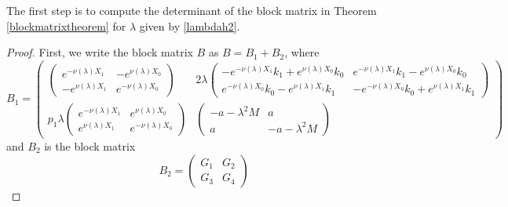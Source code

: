 \documentclass[thesis.tex]{subfiles}
\begin{document}
The first step is to compute the determinant of the block matrix in Theorem \ref{blockmatrixtheorem} for $\lambda$ given by \cref{lambdah2}.

\begin{lemma}\label{2blockmatrix}
\begin{proof}
First, we write the block matrix $B$ as $B = B_1 + B_2$, where
\[
B_1 = \begin{pmatrix}
\begin{pmatrix}
e^{-\nu(\lambda)X_1} & -e^{\nu(\lambda)X_0} \\
-e^{\nu(\lambda)X_1} & e^{-\nu(\lambda)X_0} 
\end{pmatrix} &
2 \lambda \begin{pmatrix}
-e^{-\nu(\lambda)X_1} k_1 + e^{\nu(\lambda)X_0} k_0 & e^{-\nu(\lambda)X_1} k_1 - e^{\nu(\lambda)X_0} k_0 \\ e^{-\nu(\lambda)X_0} k_0 - e^{\nu(\lambda)X_1} k_1 & -e^{-\nu(\lambda)X_0} k_0 + e^{\nu(\lambda)X_1} k_1
\end{pmatrix} \\
p_1 \lambda
\begin{pmatrix}
e^{-\nu(\lambda)X_1} & e^{\nu(\lambda)X_0} \\
e^{\nu(\lambda)X_1} & e^{-\nu(\lambda)X_0} 
\end{pmatrix} &
\begin{pmatrix}
-a - \lambda^2 M & a \\
a & -a - \lambda^2 M
\end{pmatrix}
\end{pmatrix}
\]
and $B_2$ is the block matrix 
\[
B_2 = \begin{pmatrix}
G_1 & G_2 \\ G_3 & G_4
\end{pmatrix}
\]


\end{proof}
\end{lemma}
\end{document}
